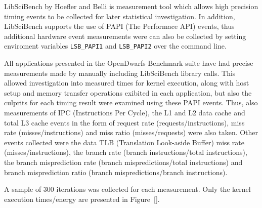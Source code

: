 \documentclass[../document.tex]{subfiles}
\begin{document}
\label{ssec:time}

LibSciBench by Hoefler and Belli \cite{hoefler2015scientific} is measurement
tool which allows high precision timing events to be collected for later
statistical investigation. In addition, LibSciBench supports the use of
PAPI (The Performace API) \cite{mucci1999papi} events, thus additional
hardware event measurements were can also be collected by setting enviroment
variables {\tt LSB\_PAPI1} and {\tt LSB\_PAPI2} over the command line.

All applications presented in the OpenDwarfs Benchmark suite have had precise
measurements made by manually including LibSciBench library calls. This allowed
investigation into measured times for kernel execution, along with host setup
and memory transfer operations exibited in each application, but also the
culprits for each timing result were examined using these PAPI events. Thus,
also measurements of IPC (Instructions Per Cycle), the L1 and L2 data cache
and total L3 cache events in the form of request rate (requests/instructions),
miss rate (misses/instructions) and miss ratio (misses/requests) were also
taken. Other events collected were the data TLB (Translation Look-aside Buffer)
miss rate (misses/instructions), the branch rate (branch instructions/total
instructions), the branch misprediction rate (branch mispredictions/total
instructions) and branch misprediction ratio (branch mispredictions/branch
instructions).

A sample of 300 iterations was collected for each measurement.
Only the kernel execution times/energy are presented in Figure~\ref{}. 
\end{document}

